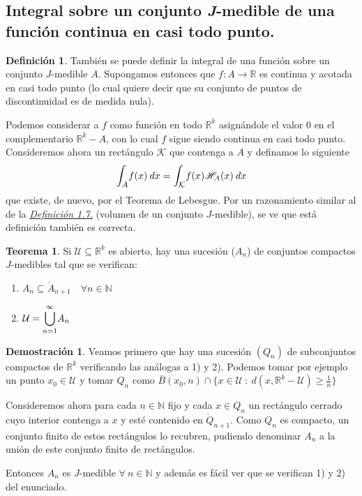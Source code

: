 \documentclass[12pt,twoside]{report}
\newcommand\mc[1]{\mathcal{#1}}
\theoremstyle{azul}
\theoremstyle{azul2}
\theoremstyle{plain}
\theoremstyle{definition}
\newtheorem{defin}{Definición}[chapter]
\newtheorem*{dem}{Demostración}
\newtheorem{teo}{Teorema}[chapter]
\theoremstyle{remark}
\begin{document}
\subsection{Integral sobre un conjunto \textit{J}-medible de una función continua en casi todo punto.}
\begin{defin} También se puede definir la integral de una función sobre un conjunto $J$-medible $A$. Supongamos entonces que $f: A \longrightarrow \mathbb{R}$ es continua y acotada en casi todo punto (lo cual quiere decir que su conjunto de puntos de discontinuidad es de medida nula). 

Podemos considerar a $f$ como función en todo $\mathbb{R}^k$ asignándole el valor 0 en el complementario $\mathbb{R}^k - A$, con lo cual $f$ sigue siendo continua en casi todo punto. Consideremos ahora un rectángulo $\mc{K}$ que contenga a $A$ y definamos lo siguiente
$$\mathlarger{\int_{A}}f(x) \: dx = \mathlarger{\int_{\mc{K}}}f(x)\mathscr{H}_A(x) \: dx$$
que existe, de nuevo, por el Teorema de Lebesgue. Por un razonamiento similar al de la \hyperref[defvol]{\textit{Definición 1.7.}} (volumen de un conjunto $J$-medible), se ve que está definición también es correcta.
\end{defin}
\begin{teo}\: \label{teo1.9.} 
Si $\mc{U} \subseteq \mathbb{R}^k$ es abierto, hay una sucesión ($A_n$) de conjuntos compactos $J$-medibles tal que se verifican:
\begin{enumerate}[1)] \vspace{-3mm}
    \item $A_n \subseteq \mathring{A}_{n+1} \quad \forall n \in \mathbb{N}$
    \item $\mc{U} = \overset{\infty}{\underset{n=1}{\mathlarger{\bigcup}}} A_n$
\end{enumerate}
\end{teo}
\begin{dem}
Veamos primero que hay una sucesión $(Q_n)$ de subconjuntos compactos de $\mathbb{R}^k$ verificando las análogas a 1) y 2). Podemos tomar por ejemplo un punto $x_0 \in \mc{U}$ y tomar $Q_n$ como $\bar{B}(x_0,n)\cap \{x \in \mc{U} \: : \: d(x,\mathbb{R}^k-\mc{U}) \geq \frac{1}{n}\}$

Consideremos ahora para cada $n \in \mathbb{N}$ fijo y cada $x \in Q_n$ un rectángulo cerrado cuyo interior contenga a $x$ y esté contenido en $\mathring{Q}_{n+1}$. Como $Q_n$ es compacto, un conjunto finito de estos rectángulos lo recubren, pudiendo denominar $A_n$ a la unión de este conjunto finito de rectángulos.

Entonces $A_n$ es $J$-medible $\forall \: n \in \mathbb{N}$ y además es fácil ver que se verifican 1) y 2) del enunciado. 
\end{dem}
\end{document}
